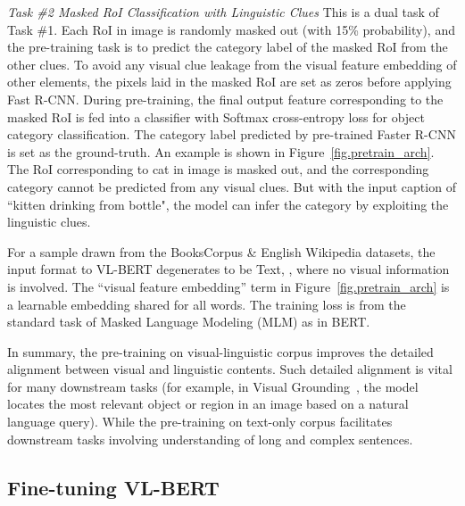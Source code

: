 \documentclass{article} \usepackage{iclr2020_conference,times}
\begin{document}
\emph{Task \#2 Masked RoI Classification with Linguistic Clues} This is a dual task of Task \#1. Each RoI in image is randomly masked out (with 15\% probability), and the pre-training task is to predict the category label of the masked RoI from the other clues. 
To avoid any visual clue leakage from the visual feature embedding of other elements, the pixels laid in the masked RoI are set as zeros before applying Fast R-CNN. During pre-training, the final output feature corresponding to the masked RoI is fed into a classifier with Softmax cross-entropy loss for object category classification. The category label predicted by pre-trained Faster R-CNN is set as the ground-truth. An example is shown in Figure~\ref{fig.pretrain_arch}. The RoI corresponding to cat in image is masked out, and the corresponding category cannot be predicted from any visual clues. But with the input caption of ``kitten drinking from bottle", the model can infer the category by exploiting the linguistic clues.



For a sample drawn from the BooksCorpus \& English Wikipedia datasets, the input format to VL-BERT degenerates to be Text, , where no visual information is involved. The ``visual feature embedding'' term in Figure~\ref{fig.pretrain_arch} is a learnable embedding shared for all words. The training loss is from the standard task of Masked Language Modeling (MLM) as in BERT.



In summary, the pre-training on visual-linguistic corpus improves the detailed alignment between visual and linguistic contents. Such detailed alignment is vital for many downstream tasks (for example, in Visual Grounding~\citep{kazemzadeh2014referitgame}, the model locates the most relevant object or region in an image based on a natural language query). While the pre-training on text-only corpus facilitates downstream tasks involving understanding of long and complex sentences.





\subsection{Fine-tuning VL-BERT}
\end{document}
